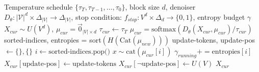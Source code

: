 \begin{algorithm}
\caption{EB Block Denoising}
\caption{EB Block Denoising}
\label{alg:eb-base}
\begin{algorithmic}[1] %
    \REQUIRE Temperature schedule $\{\tau_T, \tau_{T-1}, \dots, \tau_{0}\}$, block size $d$, denoiser $D_{\theta}: |\mathcal{V}|^d \times \Delta_{|V|} \to \Delta_{|V|}$, stop condition: $f_{stop}: 
V^d \times \Delta_{d} \to \{ 0, 1 \}$, entropy budget $\gamma$
    \STATE $X_{cur} \sim U(V^d)$, $\mu_{cur} = \vec{0}_{|V| \times d}$
    \STATE $\tau_{cur} \gets \tau_{T}$
        \STATE $ \mu_{cur}  = \text{softmax} (D_{\theta}(X_{cur}, \mu_{cur}) / \tau_{cur})$
        \STATE sorted-indices, entropies = sort$(H(\text{Cat}(\mu_{new})))$
        \STATE update-tokens, update-pos $\gets \{\}, \{\}$
        \STATE $i \gets \text{sorted-indices.pop()}$ 
        \STATE $x \sim \text{cat}(\mu_{cur}[i])$
        \STATE $\gamma_{running} += \text{entropies}[i]$
        \ENDWHILE
    \STATE $X_{cur}[\text{update-pos}] \gets \text{update-tokens}$
    \STATE $X_{cur}[\neg \text{update-pos}] \gets U(V)$
    \ENDWHILE    
    \RETURN $X_{cur}$
\end{algorithmic}
\end{algorithm}